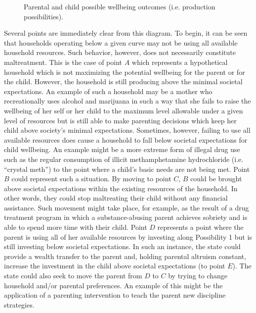 \documentclass[review]{elsarticle}\usepackage[]{graphicx}\usepackage[]{color}
\begin{document}
\begin{figure}[htp] 
\caption{Parental and child possible wellbeing outcomes (i.e. production possibilities).}
\label{fig:fig4}
\end{figure}  

Several points are immediately clear from this diagram. To begin, it can
be seen that households operating below a given curve may not be using
all available household resources. Such behavior, however, does not
necessarily constitute maltreatment. This is the case of point $A$ which
represents a hypothetical household which is not maximizing the
potential wellbeing for the parent or for the child. However, the
household is still producing above the minimal societal expectations. An
example of such a household may be a mother who recreationally uses
alcohol and marijuana in such a way that she fails to raise the
wellbeing of her self or her child to the maximum level allowable under
a given level of resources but is still able to make parenting decisions
which keep her child above society's minimal expectations. Sometimes,
however, failing to use all available resources does cause a household
to fall below societal expectations for child wellbeing. An example
might be a more extreme form of illegal drug use such as the regular
consumption of illicit methamphetamine hydrochloride (i.e. ``crystal
meth'') to the point where a child's basic needs are not being met.
Point $B$ could represent such a situation. By moving to point $C$, $B$
could be brought above societal expectations within the existing
resources of the household. In other words, they could stop maltreating
their child without any financial assistance. Such movement might take
place, for example, as the result of a drug treatment program in which a
substance-abusing parent achieves sobriety and is able to spend more
time with their child. Point $D$ represents a point where the parent is
using all of her available resources by investing along Possibility 1
but is still investing below societal expectations. In such an instance,
the state could provide a wealth transfer to the parent and, holding
parental altruism constant, increase the investment in the child above
societal expectations (to point $E$). The state could also seek to move
the parent from $D$ to $C$ by trying to change household and/or parental
preferences. An example of this might be the application of a parenting
intervention to teach the parent new discipline strategies.
\end{document}
